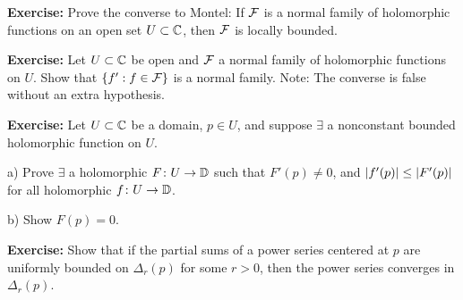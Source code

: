 \documentclass[10pt,aspectratio=169]{beamer}
\begin{document}
\begin{frame}
\textbf{Exercise:}
Prove the converse to Montel:
If ${\mathcal{F}}$ is a normal family of holomorphic functions on an open set $U \subset {\mathbb{C}}$,
then ${\mathcal{F}}$ is locally bounded.

\pause
\medskip

\textbf{Exercise:}
Let $U \subset {\mathbb{C}}$ be open and ${\mathcal{F}}$ a normal family of
holomorphic functions on $U$.
Show that $\{ f' : f \in {\mathcal{F}} \}$ is a normal family.
\pause
Note: The converse is false without an extra hypothesis.

\pause
\medskip

\textbf{Exercise:}
Let $U \subset {\mathbb{C}}$ be a domain, $p \in U$,
and suppose $\exists$ a nonconstant
bounded holomorphic function on $U$.

\pause
a)
Prove $\exists$ a holomorphic $F \colon U \to {\mathbb{D}}$
such that
$F'(p) \not= 0$, and
$\lvert {f'(p)} \rvert \leq \lvert {F'(p)} \rvert$
for all holomorphic
$f \colon U \to {\mathbb{D}}$.

\pause
b)
Show
$F(p) = 0$.

\medskip
\pause

\textbf{Exercise:}
Show that if the partial sums of a power series centered at $p$
are uniformly bounded on $\Delta_r(p)$ for some $r > 0$,
then the power series converges in $\Delta_r(p)$.


\end{frame}
\end{document}
